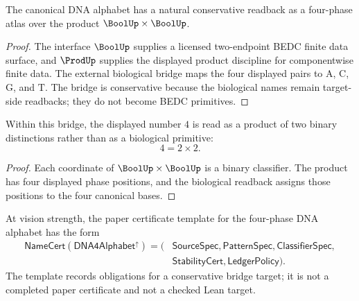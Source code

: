 \begin{theorem}
\label{thm:philosophy-dna-four-base-product-bridge}
The canonical DNA alphabet has a natural conservative readback as a
four-phase atlas over the product $\BoolUp\times\BoolUp$.
\end{theorem}
\begin{proof}
The interface $\BoolUp$ supplies a licensed two-endpoint BEDC finite
data surface, and $\ProdUp$ supplies the displayed product discipline
for componentwise finite data. The external biological bridge maps the
four displayed pairs to $\mathrm{A}$, $\mathrm{C}$, $\mathrm{G}$, and
$\mathrm{T}$. The bridge is conservative because the biological names
remain target-side readbacks; they do not become BEDC primitives.
\end{proof}

\begin{corollary}
\label{cor:philosophy-dna-four-as-double-distinction}
Within this bridge, the displayed number $4$ is read as a product of
two binary distinctions rather than as a biological primitive:
$$
  4=2\times 2.
$$
\end{corollary}
\begin{proof}
Each coordinate of $\BoolUp\times\BoolUp$ is a binary classifier. The
product has four displayed phase positions, and the biological readback
assigns those positions to the four canonical bases.
\end{proof}

\begin{definition}
\label{def:philosophy-dna-four-phase-namecert-template}
At vision strength, the paper certificate template for the four-phase
DNA alphabet has the form
$$
\begin{aligned}
  \mathsf{NameCert}(\mathsf{DNA4Alphabet}^{\uparrow})
  =
  (&\mathsf{SourceSpec},
    \mathsf{PatternSpec},
    \mathsf{ClassifierSpec},\\
   &\mathsf{StabilityCert},
    \mathsf{LedgerPolicy}).
\end{aligned}
$$
The template records obligations for a conservative bridge target; it
is not a completed paper certificate and not a checked Lean target.
\end{definition}

